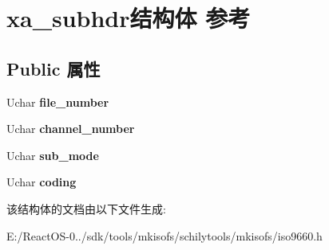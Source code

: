 \hypertarget{structxa__subhdr}{}\section{xa\+\_\+subhdr结构体 参考}
\label{structxa__subhdr}
\subsection*{Public 属性}
\begin{DoxyCompactItemize}
\item 
\mbox{\label{structxa__subhdr_a4613352e2bca0ba09f91e77b4aac08b1}} 
Uchar {\bfseries file\+\_\+number}
\item 
\mbox{\label{structxa__subhdr_a577d9eeef4dd0cee740d6d98451ed00b}} 
Uchar {\bfseries channel\+\_\+number}
\item 
\mbox{\label{structxa__subhdr_a769d66357d7e50b805f69576ab36e521}} 
Uchar {\bfseries sub\+\_\+mode}
\item 
\mbox{\label{structxa__subhdr_a4a20859e043e742c5c31078efdb663ce}} 
Uchar {\bfseries coding}
\end{DoxyCompactItemize}


该结构体的文档由以下文件生成\+:\begin{DoxyCompactItemize}
\item 
E\+:/\+React\+O\+S-\/0../sdk/tools/mkisofs/schilytools/mkisofs/iso9660.\+h\end{DoxyCompactItemize}
